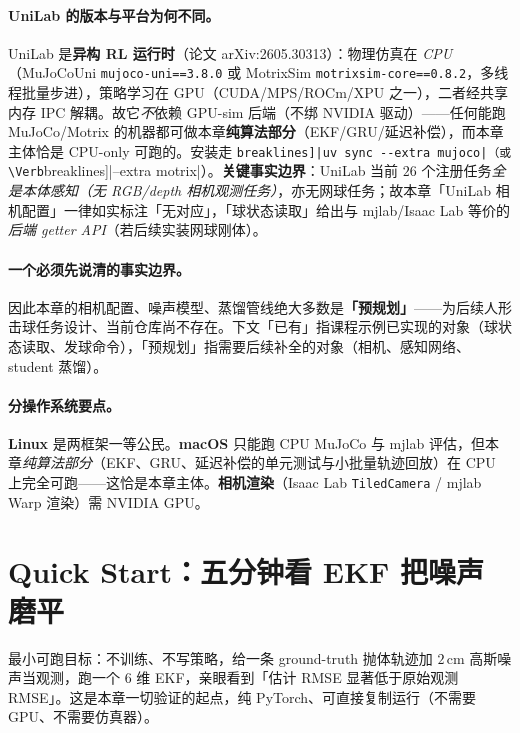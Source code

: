 \paragraph{UniLab 的版本与平台为何不同。}UniLab 是\textbf{异构 RL 运行时}（论文 arXiv:2605.30313）：物理仿真在 \emph{CPU}（MuJoCoUni \texttt{mujoco-uni==3.8.0} 或 MotrixSim \texttt{motrixsim-core==0.8.2}，多线程批量步进），策略学习在 GPU（CUDA/MPS/ROCm/XPU 之一），二者经共享内存 IPC 解耦。故它\emph{不}依赖 GPU-sim 后端（不绑 NVIDIA 驱动）——任何能跑 MuJoCo/Motrix 的机器都可做本章\textbf{纯算法部分}（EKF/GRU/延迟补偿），而本章主体恰是 CPU-only 可跑的。安装走 \Verb[breaklines]|uv sync --extra mujoco|（或 \Verb[breaklines]|--extra motrix|）。\textbf{关键事实边界}：UniLab 当前 $26$ 个注册任务\emph{全是本体感知（无 RGB/depth 相机观测任务）}，亦无网球任务；故本章「UniLab 相机配置」一律如实标注「无对应」，「球状态读取」给出与 mjlab/Isaac Lab 等价的\emph{后端 getter API}（若后续实装网球刚体）。

\paragraph{一个必须先说清的事实边界。}因此本章的相机配置、噪声模型、蒸馏管线绝大多数是\textbf{「预规划」}——为后续人形击球任务设计、当前仓库尚不存在。下文「已有」指课程示例已实现的对象（球状态读取、发球命令），「预规划」指需要后续补全的对象（相机、感知网络、student 蒸馏）。

\paragraph{分操作系统要点。}\textbf{Linux} 是两框架一等公民。\textbf{macOS} 只能跑 CPU MuJoCo 与 mjlab 评估，但本章\emph{纯算法部分}（EKF、GRU、延迟补偿的单元测试与小批量轨迹回放）在 CPU 上完全可跑——这恰是本章主体。\textbf{相机渲染}（Isaac Lab \verb|TiledCamera| / mjlab Warp 渲染）需 NVIDIA GPU。

\section*{Quick Start：五分钟看 EKF 把噪声磨平}
\label{sec:rlmc-perc-quickstart}

最小可跑目标：不训练、不写策略，给一条 ground-truth 抛体轨迹加 $2$\,cm 高斯噪声当观测，跑一个 $6$ 维 EKF，亲眼看到「估计 RMSE 显著低于原始观测 RMSE」。这是本章一切验证的起点，纯 PyTorch、可直接复制运行（不需要 GPU、不需要仿真器）。

